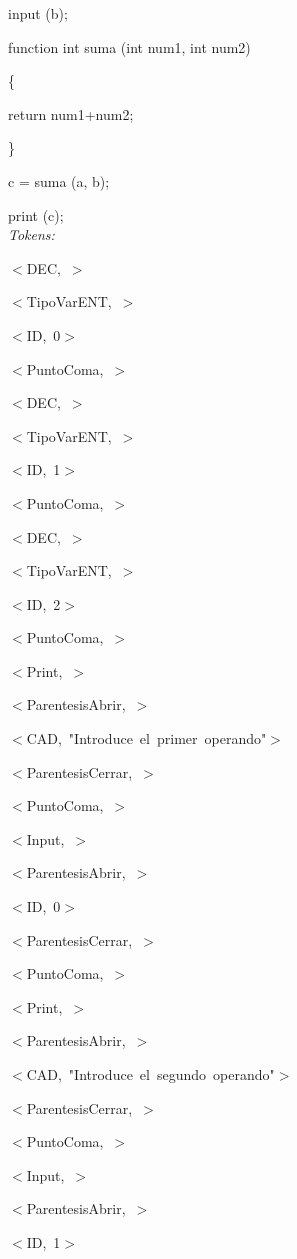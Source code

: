 \documentclass[a4paper, 12pt]{article}
\begin{document}
input (b);
 
 function int suma (int num1, int num2)

\{

	return num1+num2;
	
\}

c = suma (a, b);

print (c);\medskip \\
\emph{Tokens:}


 \mbox{$<$DEC, $>$ }
 
 
 \mbox{$<$TipoVarENT, $>$ }
 
 
 \mbox{$<$ID, 0$>$ }
 
 
 \mbox{$<$PuntoComa, $>$ }
 
 
 \mbox{$<$DEC, $>$ }
 
 
 \mbox{$<$TipoVarENT, $>$ }
 
 
 \mbox{$<$ID, 1$>$ }
 
 
 \mbox{$<$PuntoComa, $>$ }
 
 
 \mbox{$<$DEC, $>$ }
 
 
 \mbox{$<$TipoVarENT, $>$ }
 
 
 \mbox{$<$ID, 2$>$ }
 
 
 \mbox{$<$PuntoComa, $>$}
 
 
 \mbox{$<$Print, $>$ }
 
 
 \mbox{$<$ParentesisAbrir, $>$ }
 
 
 \mbox{$<$CAD, \textnormal{"Introduce el primer operando"}$>$ }
 

 \mbox{$<$ParentesisCerrar, $>$ }
 
 
 \mbox{$<$PuntoComa, $>$ }
 
 
 \mbox{$<$Input, $>$ }
 
 
 \mbox{$<$ParentesisAbrir, $>$ }
 
 
 \mbox{$<$ID, 0$>$ }
 
 
 \mbox{$<$ParentesisCerrar, $>$ }
 
 
 \mbox{$<$PuntoComa, $>$ }
 
 
 \mbox{$<$Print, $>$ }
 
 
 \mbox{$<$ParentesisAbrir, $>$ }
 

 \mbox{$<$CAD, \textnormal{"Introduce el segundo operando"}$>$ }
 
 
 \mbox{$<$ParentesisCerrar, $>$ }
 
 
 \mbox{$<$PuntoComa, $>$ }
 
 
 \mbox{$<$Input, $>$ }
 
 
 \mbox{$<$ParentesisAbrir, $>$ }
 
 
 \mbox{$<$ID, 1$>$ }
 
\end{document}
